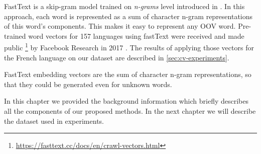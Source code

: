 FastText is a skip-gram model trained on \textit{n-grams} level
introduced in \cite{Bojanowski-ACL2017}. In this approach, each word
is represented as a sum of character n-gram representations of this word's
components. This makes it easy to represent any OOV word. Pre-trained word vectors for 157 languages using fastText were received and made public \footnote{\url{https://fasttext.cc/docs/en/crawl-vectors.html}} by Facebook Research in 2017 \citep{Mikolov-2017}. The results of applying those vectors for the French language on our dataset are described in \ref{sec:cv-experiments}.

FastText embedding vectors are the sum of character n-gram representations, so that they could be generated even for unknown words. 


\bigskip
In this chapter we provided the background information which briefly describes all the components of our proposed methods. In the next chapter we will describe the dataset used in experiments.